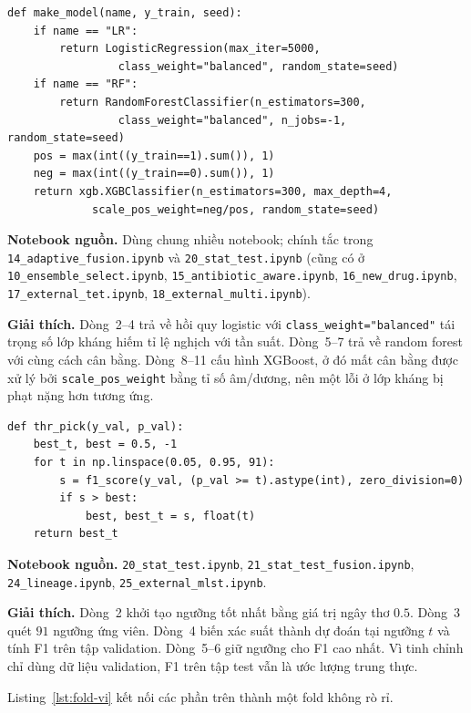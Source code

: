 \documentclass[../main.tex]{subfiles}
\begin{document}
\begin{lstlisting}[caption={Nhà máy tạo mô hình.},label=lst:model-vi]
def make_model(name, y_train, seed):
    if name == "LR":
        return LogisticRegression(max_iter=5000,
                 class_weight="balanced", random_state=seed)
    if name == "RF":
        return RandomForestClassifier(n_estimators=300,
                 class_weight="balanced", n_jobs=-1, random_state=seed)
    pos = max(int((y_train==1).sum()), 1)
    neg = max(int((y_train==0).sum()), 1)
    return xgb.XGBClassifier(n_estimators=300, max_depth=4,
             scale_pos_weight=neg/pos, random_state=seed)
\end{lstlisting}

\noindent\textbf{Notebook nguồn.} Dùng chung nhiều notebook; chính tắc trong \texttt{14\_adaptive\_fusion.ipynb} và \texttt{20\_stat\_test.ipynb} (cũng có ở \texttt{10\_ensemble\_select.ipynb}, \texttt{15\_antibiotic\_aware.ipynb}, \texttt{16\_new\_drug.ipynb}, \texttt{17\_external\_tet.ipynb}, \texttt{18\_external\_multi.ipynb}).

\noindent\textbf{Giải thích.} Dòng~2--4 trả về hồi quy logistic với \texttt{class\_weight="balanced"} tái trọng số lớp kháng hiếm tỉ lệ nghịch với tần suất. Dòng~5--7 trả về random forest với cùng cách cân bằng. Dòng~8--11 cấu hình XGBoost, ở đó mất cân bằng được xử lý bởi \texttt{scale\_pos\_weight} bằng tỉ số âm/dương, nên một lỗi ở lớp kháng bị phạt nặng hơn tương ứng.

\begin{lstlisting}[caption={Tinh chỉnh ngưỡng theo F1.},label=lst:thr-vi]
def thr_pick(y_val, p_val):
    best_t, best = 0.5, -1
    for t in np.linspace(0.05, 0.95, 91):
        s = f1_score(y_val, (p_val >= t).astype(int), zero_division=0)
        if s > best:
            best, best_t = s, float(t)
    return best_t
\end{lstlisting}

\noindent\textbf{Notebook nguồn.} \texttt{20\_stat\_test.ipynb}, \texttt{21\_stat\_test\_fusion.ipynb}, \texttt{24\_lineage.ipynb}, \texttt{25\_external\_mlst.ipynb}.

\noindent\textbf{Giải thích.} Dòng~2 khởi tạo ngưỡng tốt nhất bằng giá trị ngây thơ $0.5$. Dòng~3 quét $91$ ngưỡng ứng viên. Dòng~4 biến xác suất thành dự đoán tại ngưỡng $t$ và tính F1 trên tập validation. Dòng~5--6 giữ ngưỡng cho F1 cao nhất. Vì tinh chỉnh chỉ dùng dữ liệu validation, F1 trên tập test vẫn là ước lượng trung thực.

Listing~\ref{lst:fold-vi} kết nối các phần trên thành một fold không rò rỉ.
\end{document}
